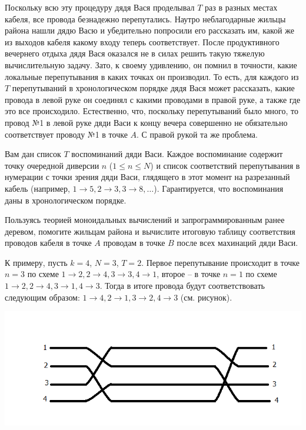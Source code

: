 \documentclass[a4paper,11pt]{article}
\begin{document}
\begin{enumerate}[{3-}1]
\begin{enumerate}
Поскольку всю эту процедуру дядя Вася проделывал $T$ раз в разных местах
кабеля, все провода безнадежно перепутались. Наутро неблагодарные жильцы
района нашли дядю Васю и убедительно попросили его рассказать им, какой же
из выходов кабеля какому входу теперь соответствует. После продуктивного
вечернего отдыха дядя Вася оказался не в силах решить такую тяжелую
вычислительную задачу. Зато, к своему удивлению, он помнил в точности, какие
локальные перепутывания в каких точках он производил. То есть, для каждого из
$T$ перепутываний в хронологическом порядке дядя Вася может рассказать, какие
провода в левой руке он соединял с какими проводами в правой руке, а также где
это все происходило. Естественно, что, поскольку перепутываний было много, то
провод №1 в левой руке дяди Васи к концу вечера совершенно не обязательно
соответствует проводу №1 в точке $A$. С правой рукой та же проблема.

Вам дан список $T$ воспоминаний дяди Васи. Каждое воспоминание содержит точку
очередной диверсии $n$ ($1 \le n \le N$) и список соответствий перепутывания в
нумерации с точки зрения дяди Васи, глядящего в этот момент на разрезанный
кабель (например, $1 \to 5, 2 \to 3, 3 \to 8, \ldots$). Гарантируется, что
воспоминания даны в хронологическом порядке.

Пользуясь теорией моноидальных вычислений и запрограммированным ранее деревом,
помогите жильцам района и вычислите итоговую таблицу соответствия проводов
кабеля в точке $A$ проводам в точке $B$ после всех махинаций дяди Васи.

К примеру, пусть $k=4$, $N=3$, $T=2$. Первое перепутывание происходит в точке
$n=3$ по схеме $1\to2,2\to4,3\to3,4\to1$, второе -- в точке $n=1$ по схеме
$1\to2,2\to4,3\to1,4\to3$. Тогда в итоге провода будут соответствовать 
следующим образом: $1\to4,2\to1,3\to2,4\to3$ (см. рисунок).
\begin{center}
\includegraphics[scale=0.6]{problems2/wires.png}
\end{center}
\end{enumerate}
\end{enumerate}
\end{document}
